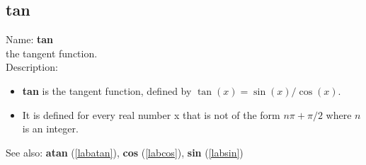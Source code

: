 \subsection{tan}
\label{labtan}
\noindent Name: \textbf{tan}\\
the tangent function.\\

\noindent Description: \begin{itemize}

\item \textbf{tan} is the tangent function, defined by $\tan(x) = \sin(x)/\cos(x)$.

\item It is defined for every real number x that is not of the form $n\pi + \pi/2$ where $n$ is an integer.
\end{itemize}
See also: \textbf{atan} (\ref{labatan}), \textbf{cos} (\ref{labcos}), \textbf{sin} (\ref{labsin})
